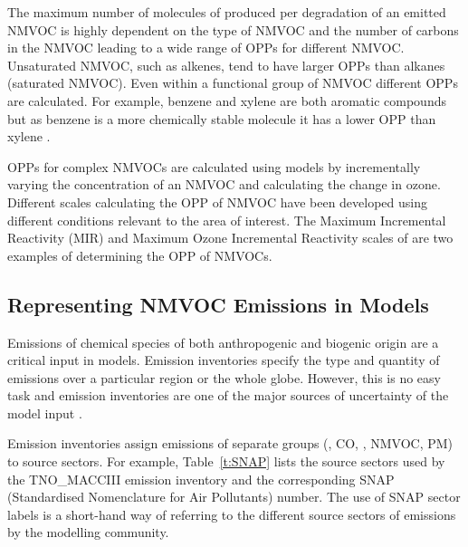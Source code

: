 The maximum number of molecules of  produced per degradation of an emitted NMVOC is highly dependent on the type of NMVOC and the number of carbons in the NMVOC leading to a wide range of OPPs for different NMVOC.
Unsaturated NMVOC, such as alkenes, tend to have larger OPPs than alkanes (saturated NMVOC).
Even within a functional group of NMVOC different OPPs are calculated.
For example, benzene and xylene are both aromatic compounds but as benzene is a more chemically stable molecule it has a lower OPP than xylene \citep{Carter:1994}.

OPPs for complex NMVOCs are calculated using models by incrementally varying the concentration of an NMVOC and calculating the change in ozone.
Different scales calculating the OPP of NMVOC have been developed using different  conditions relevant to the area of interest.
The Maximum Incremental Reactivity (MIR) and Maximum Ozone Incremental Reactivity scales of \citet{Carter:1994} are two examples of determining the OPP of NMVOCs.

\subsection{Representing NMVOC Emissions in Models}
Emissions of chemical species of both anthropogenic and biogenic origin are a critical input in models.
Emission inventories specify the type and quantity of emissions over a particular region or the whole globe.
However, this is no easy task and emission inventories are one of the major sources of uncertainty of the model input \citep{Russell:2000}.

Emission inventories assign emissions of separate groups (, CO, , NMVOC, PM) to source sectors. 
For example, Table~\ref{t:SNAP} lists the source sectors used by the TNO\_MACCIII emission inventory and the corresponding SNAP (Standardised Nomenclature for Air Pollutants) number.
The use of SNAP sector labels is a short-hand way of referring to the different source sectors of emissions by the modelling community. 

